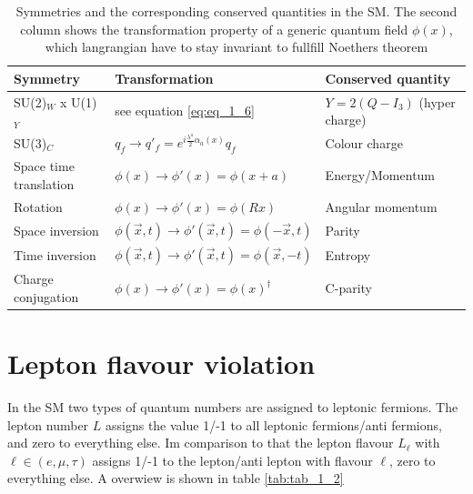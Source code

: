 \begin{table}[h]
	\centering
	\caption[Symmetries in the Standard Model]{Symmetries and the corresponding conserved quantities in the \gls{SM}. The second column shows the transformation property of a generic quantum field $\phi(x)$, which langrangian have to stay invariant to fullfill Noethers theorem}
	\label{tab:tab_1_1}

	\begin{tabular}{l|l|l}
		Symmetry					&Transformation										&Conserved quantity			\\ \hline
			
		SU(2)$_{W}$ x U(1)$_{Y}$			&see equation \ref{eq:eq_1_6}								&$Y = 2(Q - I_{3})$ (hyper charge)	\\ \hline
		
		SU(3)$_{C}$					&$q_{f} \rightarrow q'_{f} = e^{i\frac{\lambda^{a}}{2}\alpha_{a}(x)} q_{f}$		&Colour charge				\\ \hline \hline

		Space time translation 				&$\phi(x) \rightarrow \phi'(x) = \phi(x + a)$						&Energy/Momentum			\\ \hline

		Rotation					&$\phi(x) \rightarrow \phi'(x) = \phi(Rx)$						&Angular momentum			\\ \hline \hline

		Space inversion					&$\phi(\vec{x}, t) \rightarrow \phi'(\vec{x}, t) = \phi(-\vec{x}, t)$			&Parity					\\ \hline
		
		Time inversion					&$\phi(\vec{x}, t) \rightarrow \phi'(\vec{x}, t) = \phi(\vec{x}, -t)$	 		&Entropy				\\ \hline

		Charge conjugation				&$\phi(x) \rightarrow \phi'(x) = \phi(x)^{\dagger}$					&C-parity				
	\end{tabular}
\end{table}



\section{Lepton flavour violation}
\label{sec:section_1_3}

In the \gls{SM} two types of quantum numbers are assigned to leptonic fermions. The lepton number $L$ assigns the value 1/-1 to all leptonic fermions/anti fermions, and zero to everything else. Im comparison to that the lepton flavour $L_{\ell}$ with $\ell \in (e, \mu, \tau)$ assigns 1/-1 to the lepton/anti lepton with flavour $\ell$, zero to everything else. A overwiew is shown in table \ref{tab:tab_1_2}


